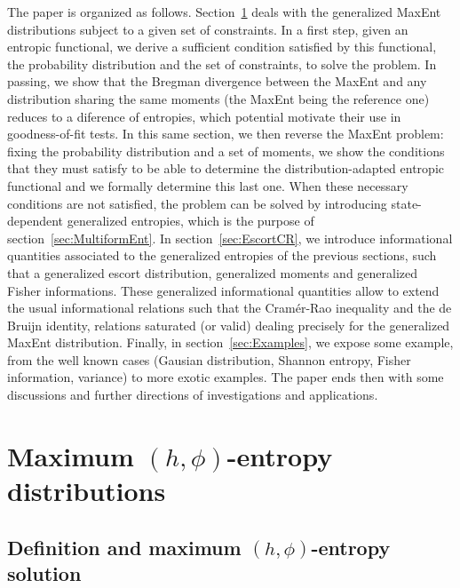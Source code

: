 \documentclass[english,sort&compress]{elsarticle}
\theoremstyle{definition}
\theoremstyle{plain}
\theoremstyle{plain}
\begin{document}
The paper  is organized as  follows. Section~\ref{sec:MaxPhiEnt} deals  with the
generalized MaxEnt  distributions subject to a  given set of  constraints.  In a
first  step, given  an entropic  functional,  we derive  a sufficient  condition
satisfied  by this  functional,  the  probability distribution  and  the set  of
constraints,  to  solve the  problem.   In passing,  we  show  that the  Bregman
divergence between the MaxEnt and any distribution sharing the same moments (the
MaxEnt  being the  reference one)  reduces to  a diference  of  entropies, which
potential motivate their use in  goodness-of-fit tests. In this same section, we
then reverse the  MaxEnt problem: fixing the probability  distribution and a set
of  moments, we  show  the  conditions that  they  must satisfy  to  be able  to
determine the distribution-adapted entropic functional and we formally determine
this last one.   When these necessary conditions are  not satisfied, the problem
can be solved by introducing state-dependent generalized entropies, which is the
purpose  of section~\ref{sec:MultiformEnt}.   In  section~\ref{sec:EscortCR}, we
introduce informational  quantities associated  to the generalized  entropies of
the previous sections, such  that a generalized escort distribution, generalized
moments  and generalized Fisher  informations.  These  generalized informational
quantities  allow to  extend the  usual  informational relations  such that  the
Cram\'er-Rao  inequality and  the de  Bruijn identity,  relations  saturated (or
valid) dealing  precisely for the generalized MaxEnt  distribution.  Finally, in
section~\ref{sec:Examples}, we  expose some example,  from the well  known cases
(Gausian distribution,  Shannon entropy,  Fisher information, variance)  to more
exotic  examples.   The  paper  ends  then with  some  discussions  and  further
directions of investigations and applications.




\section{Maximum $(h,\phi)$-entropy distributions}
\label{sec:MaxPhiEnt}



\subsection{Definition and maximum $(h,\phi)$-entropy solution}
\label{subsec:DefinitionPhiEnt}
\end{document}
